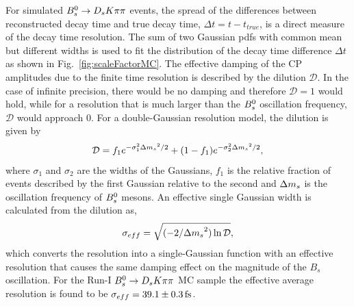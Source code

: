 For simulated ${{B}^0_{s}}\rightarrow{\ensuremath{{D}_{s}}}{\ensuremath{K}}{\ensuremath{\pi}}{\ensuremath{\pi}}$ events, the
spread of the 
differences between reconstructed decay time and true decay time,
$\Delta t = t - t_{true}$, 
is a direct measure of the decay time resolution.
The sum of two Gaussian pdfs with common mean but different widths is used to fit the distribution of the decay time difference $\Delta t$
as shown in Fig.~\ref{fig:scaleFactorMC}. 
The effective damping of the CP amplitudes due to the finite time resolution is described by the dilution $\mathcal{D}$.
In the case of infinite precision, there would be no damping and therefore  $\mathcal{D} = 1$ would hold, 
while for a resolution that is much larger than the ${{B}^0_{s}}$ oscillation frequency, $\mathcal{D}$ would approach 0.
For a double-Gaussian resolution model, the dilution is given by \cite{Aaij:2017lff}
\begin{equation}
\mathcal{D} = f_{1}e^{-\sigma_{1}^{2}{\Delta m_{{s}}}^{2}/2} + (1 - f_{1}) e^{-\sigma_{2}^{2}{\Delta m_{{s}}}^{2}/2},
\label{eq:t-dilution}
\end{equation}   
where $\sigma_{1}$ and $\sigma_{2}$ are the widths of the Gaussians, $f_{1}$ is the relative fraction of events described by the first Gaussian relative to the second and ${\Delta m_{{s}}}$ is the oscillation frequency of ${{B}^0_{s}}$ mesons.    
An effective single Gaussian width is calculated from the dilution as,
\begin{equation}
\sigma_{eff} = \sqrt{(-2/{\Delta m_{{s}}}^{2})\ln{\mathcal{D}}},
\label{eq:effres}
\end{equation}
which converts the resolution into a single-Gaussian function
with an effective resolution that causes the same damping effect on the magnitude of the $B_s$ oscillation.
For the Run-I ${{B}^0_{s}}\rightarrow{\ensuremath{{D}_{s}}}{\ensuremath{K}}{\ensuremath{\pi}}{\ensuremath{\pi}}$ MC sample the effective average resolution is found to be $\sigma_{eff} = 39.1 \pm 0.3 \mathrm{ \,fs}$. 


